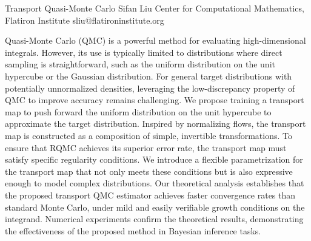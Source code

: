 \begin{talk}
  {Transport Quasi-Monte Carlo}%
  {Sifan Liu}%
  {Center for Computational Mathematics, Flatiron Institute}%
  {sliu@flatironinstitute.org}%
  {}%
  
    
   
Quasi-Monte Carlo (QMC) is a powerful method for evaluating high-dimensional integrals. However, its use is typically limited to distributions where direct sampling is straightforward, such as the uniform distribution on the unit hypercube or the Gaussian distribution. For general target distributions with potentially unnormalized densities, leveraging the low-discrepancy property of QMC to improve accuracy remains challenging. We propose training a transport map to push forward the uniform distribution on the unit hypercube to approximate the target distribution. Inspired by normalizing flows, the transport map is constructed as a composition of simple, invertible transformations. To ensure that RQMC achieves its superior error rate, the transport map must satisfy specific regularity conditions. We introduce a flexible parametrization for the transport map that not only meets these conditions but is also expressive enough to model complex distributions. Our theoretical analysis establishes that the proposed transport QMC estimator achieves faster convergence rates than standard Monte Carlo, under mild and easily verifiable growth conditions on the integrand. Numerical experiments confirm the theoretical results, demonstrating the effectiveness of the proposed method in Bayesian inference tasks.


\medskip


\end{talk}

